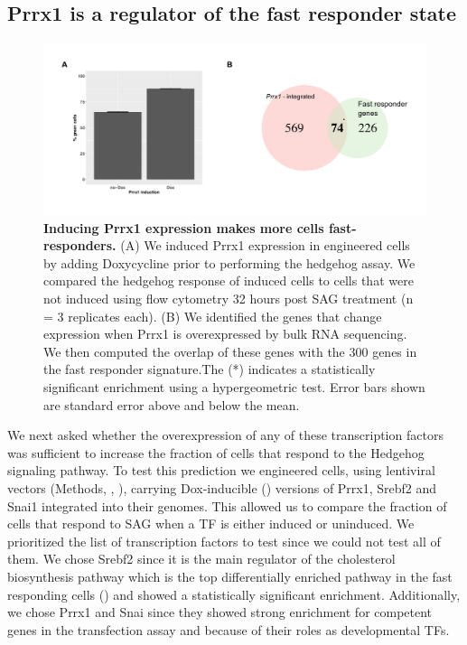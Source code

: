 \subsection{Prrx1 is a regulator of the fast responder state}
\begin{figure}[t!]  
    \centering
    \includegraphics[width=\linewidth]{figures/hedgehog/hh_figure3.pdf}
    \caption[Inducing Prrx1 expression makes more cells fast-responders.]{%
        \textbf{Inducing Prrx1 expression makes more cells fast-responders.} (A) We induced Prrx1 expression in engineered cells by adding Doxycycline prior to performing the hedgehog assay. We compared the hedgehog response of induced cells to cells that were not induced using flow cytometry 32 hours post SAG treatment (n = 3 replicates each). (B) We identified the genes that change expression when Prrx1 is overexpressed by bulk RNA sequencing. We then computed the overlap of these genes with the 300 genes in the fast responder signature.The (*) indicates a statistically significant enrichment using a hypergeometric test. Error bars shown are standard error above and below the mean.
    }
    \label{fig:hh_figure3}
\end{figure}
We next asked whether the overexpression of any of these transcription factors was sufficient to increase the fraction of cells that respond to the Hedgehog signaling pathway. To test this prediction we engineered cells, using lentiviral vectors (Methods, , ), carrying Dox-inducible () versions of Prrx1, Srebf2 and Snai1 integrated into their genomes. This allowed us to compare the fraction of cells that respond to SAG when a TF is either induced or uninduced. We prioritized the list of transcription factors to test since we could not test all of them. We chose Srebf2 since it is the main regulator of the cholesterol biosynthesis pathway which is the top differentially enriched pathway in the fast responding cells () and showed a statistically significant enrichment. Additionally, we chose Prrx1 and Snai since they showed strong enrichment for competent genes in the transfection assay and because of their roles as developmental TFs.

